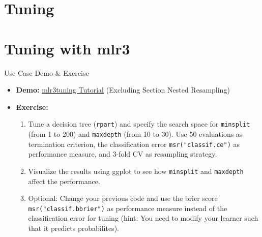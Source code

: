 \documentclass[11pt,compress]{beamer}
\begin{document}


\section{Tuning}






\section{Tuning with mlr3}


\begin{frame}{Use Case Demo \& Exercise}
\begin{itemize}
\item \textbf{Demo:} \newline\href{https://mlr3gallery.mlr-org.com/posts/2020-03-11-mlr3tuning-tutorial-german-credit/}{\underline{mlr3tuning Tutorial}} (Excluding Section Nested Resampling)
\item \textbf{Exercise:}
\begin{enumerate}
\item Tune a decision tree (\texttt{rpart}) and specify the search space for \texttt{minsplit} (from 1 to 200) and \texttt{maxdepth} (from 10 to 30). Use 50 evaluations as termination criterion, the classification error \texttt{msr("classif.ce")} as performance measure, and 3-fold CV as resampling strategy.
\item Visualize the results using ggplot to see how \texttt{minsplit} and \texttt{maxdepth} affect the performance.
\item Optional: Change your previous code and use the brier score \texttt{msr("classif.bbrier")} as performance measure instead of the classification error for tuning (hint: You need to modify your learner such that it predicts probabilites).
\end{enumerate}
\end{itemize}
\end{frame}
\end{document}
